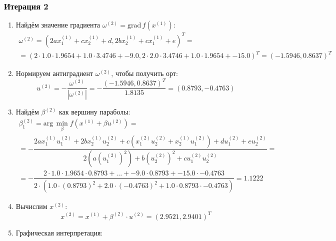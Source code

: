 \documentclass[12pt]{article}
\begin{document}
\subsubsection{Итерация 2}

\begin{enumerate}
  \item Найдём значение градиента $\omega^{(2)}=\textrm{grad}\,f(x^{(1)})$:
  \[
  \begin{gathered}
    \omega^{(2)}=(2ax_1^{(1)}+cx_2^{(1)}+d,2bx_2^{(1)}+cx_1^{(1)}+e)^T=\\
    =(2\cdot 1.0\cdot 1.9654+1.0\cdot 3.4746+-9.0, 2\cdot 2.0\cdot 3.4746+1.0\cdot 1.9654+-15.0)^T=(-1.5946, 0.8637)^T
  \end{gathered}
  \]

  \item Нормируем антиградиент \( \omega^{(2)} \), чтобы получить орт:
  \[
    u^{(2)}=-\dfrac{\omega^{(2)}}{|\omega^{(2)}|}=-\dfrac{(-1.5946, 0.8637)^T}{1.8135}=(0.8793,-0.4763)
  \]

  \item Найдём \( \beta^{(2)} \) как вершину параболы:
  \[
  \begin{gathered}
    \beta^{(2)}_1=\textrm{arg}\,\min_{\beta}f(x^{(1)}+\beta u^{(2)})=\\
    =-\dfrac{2ax^{(1)}_1u_1^{(2)}+2bx_2^{(1)}u_2^{(2)}+c(x_1^{(2)}u_2^{(2)}+x^{(1)}_2u_1^{(2)})+du_1^{(2)}+eu_2^{(2)}}{2(a(u_1^{(2)})^2)+b(u_2^{(2)})^2+cu_1^{(2)}u_2^{(2)}}=\\
    =-\dfrac{2\cdot 1.0\cdot 1.9654\cdot 0.8793+\dots+-9.0\cdot 0.8793+-15.0\cdot -0.4763}{2\cdot (1.0\cdot(0.8793)^2+2.0\cdot (-0.4763)^2+1.0\cdot 0.8793\cdot -0.4763)}=1.1222
  \end{gathered}
  \]

  \item Вычислим \( x^{(2)} \):
  \[
    x^{(2)}=x^{(1)}+\beta^{(2)}\cdot u^{(2)}=(2.9521,2.9401)^T
  \]

  \item Графическая интерпретация:
  \begin{figure}[H]
  \centering
\end{figure}
\end{enumerate}
\end{document}
